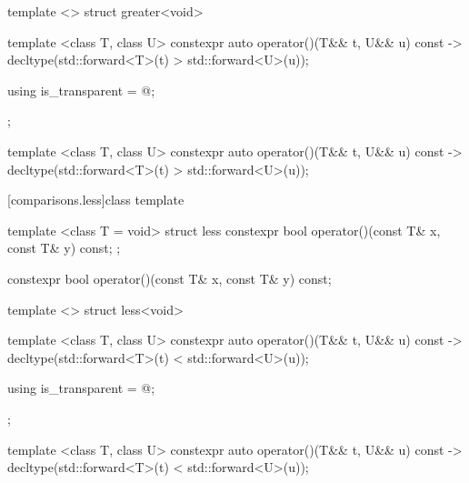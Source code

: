 \begin{itemdescr}
\pnum\returns {}
\end{itemdescr}

%
\begin{itemdecl}
template <> struct greater<void> {
  template <class T, class U> constexpr auto operator()(T&& t, U&& u) const
    -> decltype(std::forward<T>(t) > std::forward<U>(u));

  using is_transparent = @\unspec@;
};
\end{itemdecl}

%
\begin{itemdecl}
template <class T, class U> constexpr auto operator()(T&& t, U&& u) const
    -> decltype(std::forward<T>(t) > std::forward<U>(u));
\end{itemdecl}

\begin{itemdescr}
\pnum\returns {}
\end{itemdescr}

[comparisons.less]{class template }

%
\begin{itemdecl}
template <class T = void> struct less {
  constexpr bool operator()(const T& x, const T& y) const;
};
\end{itemdecl}

%
\begin{itemdecl}
constexpr bool operator()(const T& x, const T& y) const;
\end{itemdecl}

\begin{itemdescr}
\pnum\returns {}
\end{itemdescr}

%
\begin{itemdecl}
template <> struct less<void> {
  template <class T, class U> constexpr auto operator()(T&& t, U&& u) const
    -> decltype(std::forward<T>(t) < std::forward<U>(u));

  using is_transparent = @\unspec@;
};
\end{itemdecl}

%
\begin{itemdecl}
template <class T, class U> constexpr auto operator()(T&& t, U&& u) const
    -> decltype(std::forward<T>(t) < std::forward<U>(u));
\end{itemdecl}

